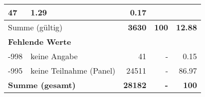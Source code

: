 \begin{longtable}{lXrrr}
       \num{47} &
       \num[round-mode=places,round-precision=2]{1.29} &
         \num[round-mode=places,round-precision=2]{0.17} \\
     \midrule
     \multicolumn{2}{l}{Summe (gültig)} &
       \textbf{\num{3630}} &
     \textbf{100} &
       \textbf{\num[round-mode=places,round-precision=2]{12.88}} \\
     \multicolumn{5}{l}{\textbf{Fehlende Werte}}\\
       -998 &
       keine Angabe &
         \num{41} &
        - &
         \num[round-mode=places,round-precision=2]{0.15} \\
       -995 &
       keine Teilnahme (Panel) &
         \num{24511} &
        - &
         \num[round-mode=places,round-precision=2]{86.97} \\
     \midrule
     \multicolumn{2}{l}{\textbf{Summe (gesamt)}} &
          \textbf{\num{28182}} &
        \textbf{-} &
        \textbf{100} \\
     \bottomrule
     \end{longtable}
     
